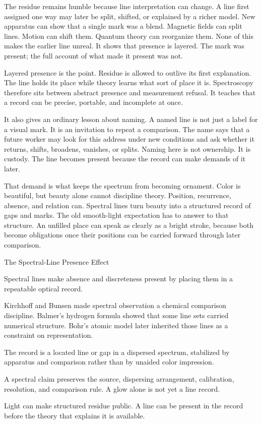 The residue remains humble because line interpretation can change. A line
first assigned one way may later be split, shifted, or explained by a richer
model. New apparatus can show that a single mark was a blend. Magnetic fields
can split lines. Motion can shift them. Quantum theory can reorganize them.
None of this makes the earlier line unreal. It shows that presence is
layered. The mark was present; the full account of what made it present was
not.

Layered presence is the point. Residue is allowed to outlive its first
explanation. The line holds its place while theory learns what sort of place
it is. Spectroscopy therefore sits between abstract presence and measurement
refusal. It teaches that a record can be precise, portable, and incomplete at
once.

It also gives an ordinary lesson about naming. A named line is not just a
label for a visual mark. It is an invitation to repeat a comparison. The name
says that a future worker may look for this address under new conditions and
ask whether it returns, shifts, broadens, vanishes, or splits. Naming here is
not ownership. It is custody. The line becomes present because the record can
make demands of it later.

That demand is what keeps the spectrum from becoming ornament. Color is
beautiful, but beauty alone cannot discipline theory. Position, recurrence,
absence, and relation can. Spectral lines turn beauty into a structured
record of gaps and marks. The old smooth-light expectation has to answer to
that structure. An unfilled place can speak as clearly as a bright stroke,
because both become obligations once their positions can be carried forward
through later comparison.

\begin{phenom}{The Spectral-Line Presence Effect~\cite{kirchhoff1860,balmer1885,bohr1913}}
\label{ph:spectral-line-presence}

\PhStatement
Spectral lines make absence and discreteness present by placing them in a
repeatable optical record.

\PhOrigin
Kirchhoff and Bunsen made spectral observation a chemical comparison
discipline. Balmer's hydrogen formula showed that some line sets carried
numerical structure. Bohr's atomic model later inherited those lines as a
constraint on representation.

\PhObservation
The record is a located line or gap in a dispersed spectrum, stabilized by
apparatus and comparison rather than by unaided color impression.

\PhConstraint
A spectral claim preserves the source, dispersing arrangement, calibration,
resolution, and comparison rule. A glow alone is not yet a line record.

\PhConsequence
Light can make structured residue public. A line can be present in the record
before the theory that explains it is available.
\end{phenom}


